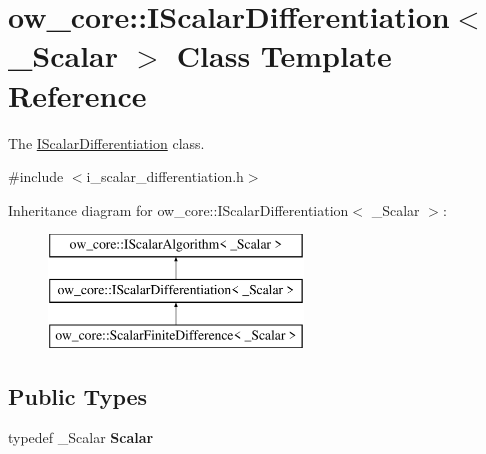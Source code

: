 \hypertarget{classow__core_1_1IScalarDifferentiation}{}\section{ow\+\_\+core\+:\+:I\+Scalar\+Differentiation$<$ \+\_\+\+Scalar $>$ Class Template Reference}
\label{classow__core_1_1IScalarDifferentiation}


The \hyperlink{classow__core_1_1IScalarDifferentiation}{I\+Scalar\+Differentiation} class.  




{\ttfamily \#include $<$i\+\_\+scalar\+\_\+differentiation.\+h$>$}

Inheritance diagram for ow\+\_\+core\+:\+:I\+Scalar\+Differentiation$<$ \+\_\+\+Scalar $>$\+:\begin{figure}[H]
\begin{center}
\leavevmode
\includegraphics[height=3.000000cm]{dd/db1/classow__core_1_1IScalarDifferentiation}
\end{center}
\end{figure}
\subsection*{Public Types}
\begin{DoxyCompactItemize}
\item 
typedef \+\_\+\+Scalar {\bfseries Scalar}\hypertarget{classow__core_1_1IScalarDifferentiation_a71eb7c93a39127fdd3c6082065892be2}{}\label{classow__core_1_1IScalarDifferentiation_a71eb7c93a39127fdd3c6082065892be2}

\end{DoxyCompactItemize}
